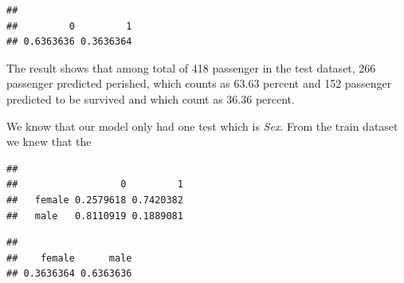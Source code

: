 \documentclass[
]{book}
\newenvironment{Shaded}{\begin{snugshade}}{\end{snugshade}}
\newcommand{\CommentTok}[1]{\textcolor[rgb]{0.56,0.35,0.01}{\textit{#1}}}
\newcommand{\DataTypeTok}[1]{\textcolor[rgb]{0.13,0.29,0.53}{#1}}
\newcommand{\DecValTok}[1]{\textcolor[rgb]{0.00,0.00,0.81}{#1}}
\newcommand{\KeywordTok}[1]{\textcolor[rgb]{0.13,0.29,0.53}{\textbf{#1}}}
\newcommand{\NormalTok}[1]{#1}
\newcommand{\OperatorTok}[1]{\textcolor[rgb]{0.81,0.36,0.00}{\textbf{#1}}}
\newcommand{\StringTok}[1]{\textcolor[rgb]{0.31,0.60,0.02}{#1}}
\begin{document}
\begin{Shaded}
\end{Shaded}

\begin{verbatim}
## 
##         0         1 
## 0.6363636 0.3636364
\end{verbatim}

The result shows that among total of 418 passenger in the test dataset, 266 passenger predicted perished, which counts as 63.63 percent and 152 passenger predicted to be survived and which count as 36.36 percent.

We know that our model only had one test which is \emph{Sex}. From the train dataset we knew that the

\begin{Shaded}
\end{Shaded}

\begin{verbatim}
##         
##                  0         1
##   female 0.2579618 0.7420382
##   male   0.8110919 0.1889081
\end{verbatim}

\begin{Shaded}
\end{Shaded}

\begin{verbatim}
## 
##    female      male 
## 0.3636364 0.6363636
\end{verbatim}
\end{document}
